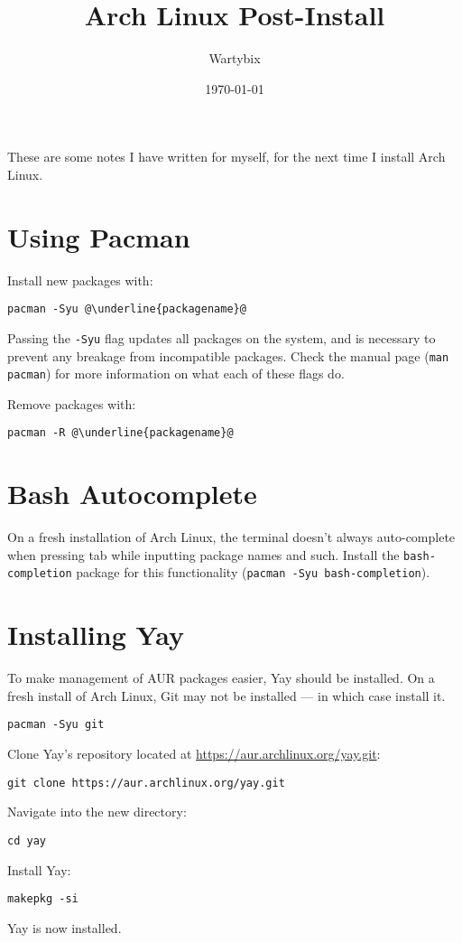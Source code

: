 \documentclass[a4paper]{article}
\title{Arch Linux Post-Install}
\author{Wartybix}
\date{\today}
\begin{document}
\maketitle

These are some notes I have written for myself, for the next time I install Arch Linux.

\section{Using Pacman}

Install new packages with:
\begin{lstlisting}[escapechar=@]
pacman -Syu @\underline{packagename}@
\end{lstlisting}
Passing the \lstinline|-Syu| flag updates all packages on the system, and is necessary to prevent any breakage from incompatible packages.
Check the manual page (\lstinline|man pacman|) for more information on what each of these 
flags do.

Remove packages with:
\begin{lstlisting}[escapechar=@]
pacman -R @\underline{packagename}@
\end{lstlisting}

\section{Bash Autocomplete}

On a fresh installation of Arch Linux, the terminal doesn't always auto-complete when pressing tab while inputting package names and such.
Install the \lstinline|bash-completion| package for this functionality (\lstinline|pacman -Syu bash-completion|).

\section{Installing Yay}

To make management of AUR packages easier, Yay should be installed.
On a fresh install of Arch Linux, Git may not be installed --- in which case install it.
\begin{lstlisting}
pacman -Syu git
\end{lstlisting}
Clone Yay's repository located at \url{https://aur.archlinux.org/yay.git}:
\begin{lstlisting}
git clone https://aur.archlinux.org/yay.git
\end{lstlisting}
Navigate into the new directory:
\begin{lstlisting}
cd yay
\end{lstlisting}
Install Yay:
\begin{lstlisting}
makepkg -si
\end{lstlisting}
Yay is now installed.
\end{document}
